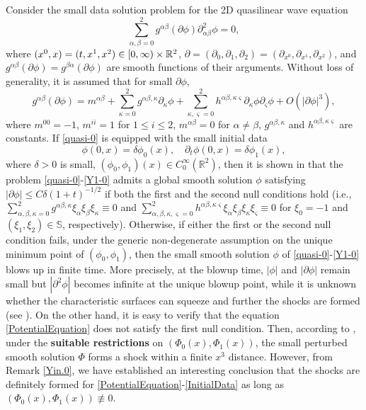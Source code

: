 \documentclass[11pt,twoside]{article}
\def\al{\alpha}
\def\dl{\delta}
\def\p{\partial}
\def\dps{\displaystyle}
\begin{document}
\begin{remark}\label{Yin.5}
Consider the small data solution problem for the 2D quasilinear wave equation
\begin{equation}\label{quasi-0}
\sum_{\al,\beta=0}^2g^{\al\beta}(\p\phi)\p_{\al\beta}^2\phi=0,
\end{equation}
where $(x^0, x)=(t, x^1, x^2)\in [0,\infty)\times\Bbb R^2$,
$\p=(\p_0,\p_1,\p_2)=(\p_{x^0}, \p_{x^1}, \p_{x^2})$, and
$g^{\al\beta}(\p\phi) =g^{\beta\al}(\p\phi)$ are smooth
functions of their arguments.
Without loss of generality, it is assumed that for small $\p\phi$,
\begin{equation}\label{H-01}
\dps g^{\al\beta}(\p\phi)=m^{\al\beta}+\sum_{\kappa=0}^{2} g^{\al\beta,\kappa}\p_\kappa\phi+\sum_{\kappa,\varsigma=0}^2h^{\al\beta,\kappa\varsigma}\p_\kappa\phi\p_\varsigma\phi+O(|\p\phi|^3),
\end{equation}
where $m^{00}=-1$, $m^{ii}=1$ for $1\le i\le 2$, $m^{\al\beta}=0$ for $\al\neq\beta$, $g^{\al\beta,\kappa}$
and $h^{\al\beta,\kappa\varsigma}$ are constants.
If \eqref{quasi-0} is equipped with the small initial data
\begin{equation}\label{Y1-0}
\phi(0,x)=\dl \phi_0(x),\quad \p_t\phi(0,x)=\dl\phi_1(x),
\end{equation}
where $\dl>0$ is small, $(\phi_0, \phi_1)(x)\in C_0^{\infty}(\mathbb R^2)$,
then it is shown in \cite{A} that the problem \eqref{quasi-0}-\eqref{Y1-0} admits a global smooth solution $\phi$ satisfying $|\partial\phi|\le C\delta(1+t)^{-1/2}$ if both the first and the second null conditions hold (i.e.,
$\dps\sum_{\al,\beta,\kappa=0}^2g^{\al\beta,\kappa}\xi_\al\xi_\beta\xi_\kappa\equiv0$ and $\dps\sum_{\al,\beta,\kappa,\varsigma=0}^2 h^{\al\beta,\kappa\varsigma}\xi_\al\xi_\beta\xi_\kappa\xi_\varsigma\equiv0$
for $\xi_0=-1$ and $(\xi_1,\xi_2)\in\mathbb S$, respectively).
Otherwise, if either the first or the second null condition fails,
under the generic non-degenerate assumption on the unique minimum point of  $(\phi_0, \phi_1)$, then the small smooth solution $\phi$ of \eqref{quasi-0}-\eqref{Y1-0} blows up in finite time. More precisely,
at the blowup time, $|\phi|$ and $|\partial\phi|$ remain small but $|\partial^{2}\phi|$ becomes infinite at the unique blowup point,
while it is unknown whether the characteristic surfaces can squeeze and further the shocks are formed (see \cite{Ali1,Ali2,H}).
On the other hand, it is easy to verify that the equation \eqref{PotentialEquation} does not satisfy the first null condition.
Then, according to \cite{Ch3,Sp}, under the {\bf suitable restrictions} on $(\Phi_0(x),\Phi_1(x))$,
the small perturbed smooth solution $\Phi$ forms a shock within a finite $x^{3}$ distance.
However, from Remark \ref{Yin.0}, we have established an interesting  conclusion that the shocks
are definitely formed for \eqref{PotentialEquation}-\eqref{InitialData}
as long as $(\Phi_0(x),\Phi_1(x))\not\equiv0$.
\end{remark}
\end{document}
